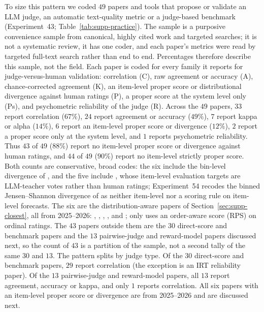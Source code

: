 To size this pattern we coded $49$ papers and tools that propose or validate an LLM judge, an automatic text-quality metric or a judge-based benchmark (Experiment~43; Table~\ref{tab:supp-practice}).
The sample is a purposive convenience sample from canonical, highly cited work and targeted searches; it is not a systematic review, it has one coder, and each paper's metrics were read by targeted full-text search rather than end to end.
Percentages therefore describe this sample, not the field.
Each paper is coded for every family it reports for judge-versus-human validation: correlation (C), raw agreement or accuracy (A), chance-corrected agreement (K), an item-level proper score or distributional divergence against human ratings (P), a proper score at the system level only (Ps), and psychometric reliability of the judge (R).
Across the $49$ papers, $33$ report correlation ($67\%$), $24$ report agreement or accuracy ($49\%$), $7$ report kappa or alpha ($14\%$), $6$ report an item-level proper score or divergence ($12\%$), $2$ report a proper score only at the system level, and $1$ reports psychometric reliability.
Thus $43$ of $49$ ($88\%$) report no item-level proper score or divergence against human ratings, and $44$ of $49$ ($90\%$) report no item-level strictly proper score. Both counts are conservative, broad codes: the six include the bin-level divergence of \citet{elangovan2025beyond}, and the five include \citet{li2026judging}, whose item-level evaluation targets are LLM-teacher votes rather than human ratings; Experiment~54 recodes the binned Jensen--Shannon divergence of \citet{elangovan2025beyond} as neither item-level nor a scoring rule on item-level forecasts. The six are the distribution-aware papers of Section~\ref{sec:supp-closest}, all from 2025--2026: \citet{elangovan2025beyond}, \citet{guerdan2025validating}, \citet{chen2025beyond}, \citet{wang2025improving}, \citet{li2026judging} and \citet{lyu2026humanresidual}; only \citet{lyu2026humanresidual} uses an order-aware score (RPS) on ordinal ratings. The $43$ papers outside them are the $30$ direct-score and benchmark papers and the $13$ pairwise-judge and reward-model papers discussed next, so the count of $43$ is a partition of the sample, not a second tally of the same $30$ and $13$.
The pattern splits by judge type.
Of the $30$ direct-score and benchmark papers, $29$ report correlation (the exception is an IRT reliability paper).
Of the $13$ pairwise-judge and reward-model papers, all $13$ report agreement, accuracy or kappa, and only $1$ reports correlation.
All six papers with an item-level proper score or divergence are from 2025--2026 and are discussed next.
